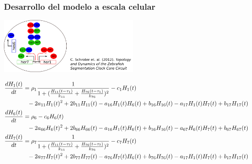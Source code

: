 \documentclass[xcolor=table, xllnames]{beamer}
\begin{document}
\begin{frame}
	\frametitle{Desarrollo del modelo a escala celular}
	\includegraphics[width=7cm]{Figuras/oscilationsref.png}
	\begin{scriptsize}
		\centering
		\begin{align*}
		\frac{dH_1(t)}{dt} &= \rho_1 \frac{1}{1+(\frac{H_{11}(t-\tau_1)}{k_{11}} + \frac{H_{76}(t-\tau_1)}{k_{76}})^2}-c_1H_1(t) \\ & \hspace{.25cm}-2a_{11}H_1(t)^2 + 2b_{11}H_{11}(t)-a_{16}H_1(t)H_6(t)+b_{16}H_{16}(t)-a_{17}H_1(t)H_7(t)+b_{17}H_{17}(t) \\ %
		\frac{dH_6(t)}{dt} &= \rho_6 -c_6H_6(t) \\ & \hspace{.25cm} -2a_{66}H_6(t)^2 + 2b_{66}H_{66}(t)-a_{16}H_1(t)H_6(t)+b_{16}H_{16}(t)-a_{67}H_6(t)H_7(t)+b_{67}H_{67}(t) \\ %
		\frac{dH_7(t)}{dt} &= \rho_7 \frac{1}{1+(\frac{H_{11}(t-\tau_7)}{k_{11}} + \frac{H_{76}(t-\tau_7)}{k_{76}})^2}-c_7H_7(t) \\ & \hspace{.25cm}-2a_{77}H_7(t)^2 + 2b_{77}H_{77}(t)-a_{76}H_7(t)H_6(t)+b_{76}H_{76}(t)-a_{17}H_1(t)H_7(t)+b_{17}H_{17}(t)  
		\end{align*}
	\end{scriptsize}
\end{frame}
\end{document}
